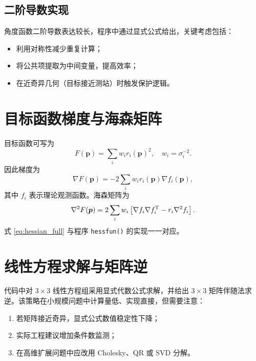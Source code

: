 \subsection{二阶导数实现}
角度函数二阶导数表达较长，程序中通过显式公式给出，关键考虑包括：
\begin{itemize}
  \item 利用对称性减少重复计算；
  \item 将公共项提取为中间变量，提高效率；
  \item 在近奇异几何（目标接近测站）时触发保护逻辑。
\end{itemize}

\section{目标函数梯度与海森矩阵}
目标函数可写为
\[
F(\bm p)=\sum_i w_i r_i(\bm p)^2,\quad w_i=\sigma_i^{-2}.
\]
因此梯度为
\begin{equation}
\nabla F(\bm p)= -2\sum_i w_i r_i(\bm p)\nabla f_i(\bm p),
\end{equation}
其中 $f_i$ 表示理论观测函数。海森矩阵为
\begin{equation}
\nabla^2 F(\bm p)=
2\sum_i w_i\left[\nabla f_i\nabla f_i^{\mathrm{T}}-r_i\nabla^2 f_i\right].
\label{eq:hessian_full}
\end{equation}
式 \eqref{eq:hessian_full} 与程序 \texttt{hessfun()} 的实现一一对应。

\section{线性方程求解与矩阵逆}
代码中对 $3\times3$ 线性方程组采用显式代数公式求解，并给出 $3\times3$ 矩阵伴随法求逆。该策略在小规模问题中计算量低、实现直接，但需要注意：
\begin{enumerate}
  \item 若矩阵接近奇异，显式公式数值稳定性下降；
  \item 实际工程建议增加条件数监测；
  \item 在高维扩展问题中应改用 Cholesky、QR 或 SVD 分解。
\end{enumerate}

